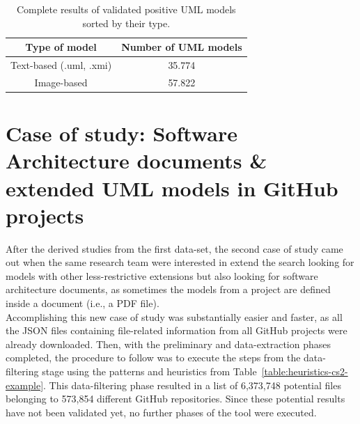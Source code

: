 \documentclass[a4paper, 12pt]{book}
\begin{document}
 \begin{table}[]
   \centering
   \caption{Complete results of validated positive UML models sorted by their type.}
   \label{table:validated-models-table}
   \begin{tabular}{|c|c|}
   \hline
   \textbf{Type of model}     & \textbf{Number of UML models}     \\ \hline
   Text-based (.uml, .xmi)    & 35.774                            \\
   Image-based                & 57.822                            \\ \hline
   \end{tabular}
 \end{table}
\section{Case of study: Software Architecture documents \& extended UML models in GitHub projects}
\label{sec:case-study-sad}
After the derived studies from the first data-set, the second case of study came out when the same research team were
interested in extend the search looking for models with other less-restrictive extensions but also looking for
software architecture documents, as sometimes the models from a project are defined inside a document (i.e., a PDF file).\\
Accomplishing this new case of study was substantially easier and faster, as all the JSON files containing file-related information
from all GitHub projects were already downloaded. Then, with the preliminary and data-extraction phases completed, the procedure to
follow was to execute the steps from the data-filtering stage using the patterns and heuristics from Table~\ref{table:heuristics-cs2-example}.
This data-filtering phase resulted in a list of 6,373,748 potential files belonging to 573,854 different GitHub repositories.
Since these potential results have not been validated yet, no further phases of the tool were executed.
\end{document}
